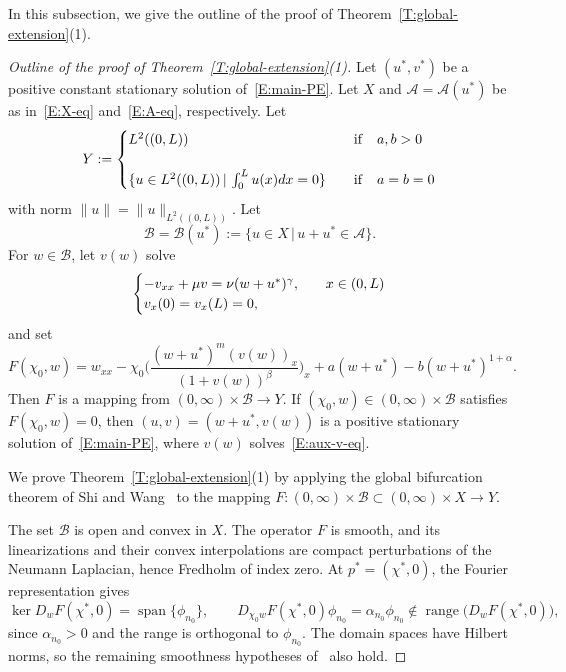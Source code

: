\documentclass[11pt]{article} %
\theoremstyle{remark}
\theoremstyle{remark}
\numberwithin{equation}{section}
\numberwithin{figure}{section}
\numberwithin{table}{section}
\begin{document}
In this subsection, we give the outline of the proof of
Theorem~\ref{T:global-extension}(1).


\begin{proof}[Outline of the proof of Theorem~\ref{T:global-extension}(1)]\leavevmode\par
  Let $(u^*,v^*)$ be a positive constant stationary solution
  of~\eqref{E:main-PE}. Let $X$ and $\mathcal{A} = \mathcal{A}(u^*)$ be as
  in~\eqref{E:X-eq} and~\eqref{E:A-eq}, respectively. Let
  \begin{equation}\label{E:Y-eq}
    Y:=\begin{cases} L^2((0,L))\qquad &{\rm if}\quad a,b>0\cr\cr
      \{u\in L^2((0,L))\,|\, \int_0^L u(x)dx=0\}\quad &{\rm if}\quad a=b=0
    \end{cases}
  \end{equation}
  with norm $\|u\| = \|u\|_{L^2((0,L))}$.
  Let
  \begin{equation}\label{E:B-eq}
    \mathcal{B}=\mathcal{B}(u^*):=\{u\in X\,|\, u+u^*\in\mathcal{A}\}.
  \end{equation}
  For $w \in \mathcal{B}$, let $v(w)$ solve
  \begin{equation}\label{E:aux-v-eq}
    \begin{cases}
      -v_{xx}+\mu v=\nu(w+u^*)^\gamma,\quad &x\in (0,L)\cr
      v_x(0)=v_x(L)=0,
    \end{cases}
  \end{equation}
  and set
  \[
    F(\chi_0,w)
    =w_{xx}
    -\chi_0\Big(
    \frac{(w+u^*)^m (v(w))_x}{(1+v(w))^\beta}
    \Big)_x
    +a(w+u^*)-b(w+u^*)^{1+\alpha}.
  \]
  Then $F$ is a mapping from $(0, \infty)\times\mathcal{B} \to Y$. If
  $(\chi_0,w) \in (0, \infty)\times \mathcal{B}$ satisfies $F(\chi_0, w) = 0$,
  then $(u,v) = (w + u^*,v(w))$ is a positive stationary solution
  of~\eqref{E:main-PE}, where $v(w)$ solves~\eqref{E:aux-v-eq}.


  We prove Theorem~\ref{T:global-extension}(1) by applying the global
  bifurcation theorem of Shi and Wang~\cite[Theorem~4.4]{shi.wang:09:on} to the
  mapping $F:(0,\infty)\times\mathcal{B} \subset (0, \infty)\times X \to Y$.

  The set $\mathcal{B}$ is open and convex in $X$. The operator $F$ is smooth,
  and its linearizations and their convex interpolations are compact
  perturbations of the Neumann Laplacian, hence Fredholm of index zero. At $p^*
  = (\chi^*,0)$, the Fourier representation gives
  \[
    \ker D_wF(\chi^*, 0)=\operatorname{span}\{\phi_{n_0}\},
    \qquad
    D_{\chi_0w}F(\chi^*,0)\phi_{n_0}
    =\alpha_{n_0}\phi_{n_0}
    \notin\operatorname{range}\big(D_wF(\chi^*,0)\big),
  \]
  since $\alpha_{n_0} > 0$ and the range is orthogonal to $\phi_{n_0}$. The
  domain spaces have Hilbert norms, so the remaining smoothness hypotheses
  of~\cite[Theorem~4.4]{shi.wang:09:on} also hold.


\end{proof}
\end{document}
